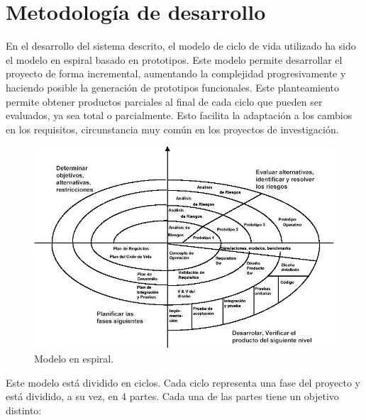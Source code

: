 \section{Metodología de desarrollo}
\label{sec:metodologiadedesarrollo}

En el desarrollo del sistema descrito, el modelo de ciclo de vida utilizado ha sido el modelo en espiral basado en prototipos. Este modelo permite desarrollar el proyecto de forma incremental, aumentando la complejidad progresivamente y haciendo posible la generación de prototipos funcionales. Este planteamiento permite obtener productos parciales al final de cada ciclo que pueden ser evaluados, ya sea total o parcialmente. Esto facilita la adaptación a los cambios en los requisitos, circunstancia muy común en los proyectos de investigación.

\begin{figure} [hbtp]
  \begin{center}
    \includegraphics[width=16cm]{img/cap2/modelo_espiral}
  \end{center}
  \caption{Modelo en espiral.}
  \label{fig:modelo_espiral}
\end{figure}

Este modelo está dividido en ciclos. Cada ciclo representa una fase del proyecto y está dividido, a su vez, en 4 partes. Cada una de las partes tiene un objetivo distinto:

